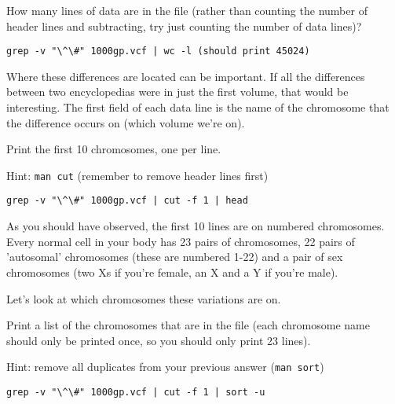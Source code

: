 \begin{questions}
How many lines of data are in the file (rather than counting the number of header lines and subtracting, try just counting the number of data lines)? \\
\begin{answer}
\begin{lstlisting}
grep -v "\^\#" 1000gp.vcf | wc -l (should print 45024)
\end{lstlisting}
\end{answer}
\end{questions}

\begin{note}
Where these differences are located can be important. If all the differences between two encyclopedias were in just the first volume, that would be interesting. The first field of each data line is the name of the chromosome that the difference occurs on (which volume we're on). 
\end{note}

\begin{questions}
Print the first 10 chromosomes, one per line. 

Hint: \texttt{man cut} (remember to remove header lines first)
\begin{answer}
\begin{lstlisting}
grep -v "\^\#" 1000gp.vcf | cut -f 1 | head
\end{lstlisting}
\end{answer}
\end{questions}

\begin{note}
As you should have observed, the first 10 lines are on numbered chromosomes. Every normal cell in your body has 23 pairs of chromosomes, 22 pairs of 'autosomal' chromosomes (these are numbered 1-22) and a pair of sex chromosomes (two Xs if you're female, an X and a Y if you're male).

Let's look at which chromosomes these variations are on. 

\end{note}
\begin{questions}
Print a list of the chromosomes that are in the file (each chromosome name should only be printed once, so you should only print 23 lines).

Hint: remove all duplicates from your previous answer (\texttt{man sort})
\begin{answer}
\begin{lstlisting}
grep -v "\^\#" 1000gp.vcf | cut -f 1 | sort -u
\end{lstlisting}
\end{answer}
\end{questions}

